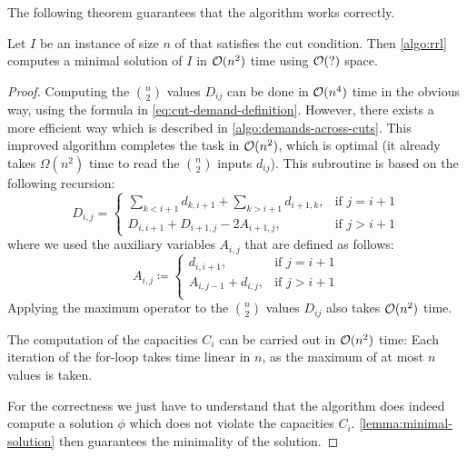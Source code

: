 The following theorem guarantees that the algorithm works correctly.
\begin{theorem}
	\label{theo:rll-algo-correct}
	Let $I$ be an instance of size $n$ of \RRL that satisfies the cut condition.
	Then \cref{algo:rrl} computes a minimal solution of $I$ in $\mathcal{O}(n^2)$ time using $\mathcal{O}(?)$ space.
\end{theorem}
\begin{proof}
	Computing the $\binom{n}{2}$ values $D_{ij}$ can be done in $\mathcal{O}(n^4)$ time in the obvious way, using the formula in \cref{eq:cut-demand-definition}.
	However, there exists a more efficient way which is described in \cref{algo:demands-across-cuts}.
	This improved algorithm completes the task in $\mathcal{O}(n^2)$, which is optimal (it already takes $\Omega(n^2)$ time to read the $\binom{n}{2}$ inputs $d_{ij}$).
	This subroutine is based on the following recursion:
	\begin{equation}
		D_{i, j} = \begin{cases}
			\sum_{k < i+1} d_{k,i+1} + \sum_{k > i+1} d_{i+1, k}, & \text{if } j = i+1 \\
			D_{i, i+1} + D_{i+1, j} - 2 A_{i+1, j}, & \text{if } j > i+1
		\end{cases}
	\end{equation}
	where we used the auxiliary variables $A_{i, j}$ that are defined as follows:
	\begin{equation}
		A_{i, j} \coloneqq \begin{cases}
				d_{i, i+1}, & \text{if } j = i+1\\
				A_{i, j-1} + d_{i, j}, &\text{if } j > i+1\\
		\end{cases}
	\end{equation}
	Applying the maximum operator to the $\binom{n}{2}$ values $D_{ij}$ also takes $\mathcal{O}(n^2)$ time.
	
	The computation of the capacities $C_i$ can be carried out in $\mathcal{O}(n^2)$ time:
	Each iteration of the for-loop takes time linear in $n$, as the maximum of at most $n$ values is taken.
	
	For the correctness we just have to understand that the algorithm does indeed compute a solution $\phi$ which does not violate the capacities $C_i$.
	\cref{lemma:minimal-solution} then guarantees the minimality of the solution.
\end{proof}


